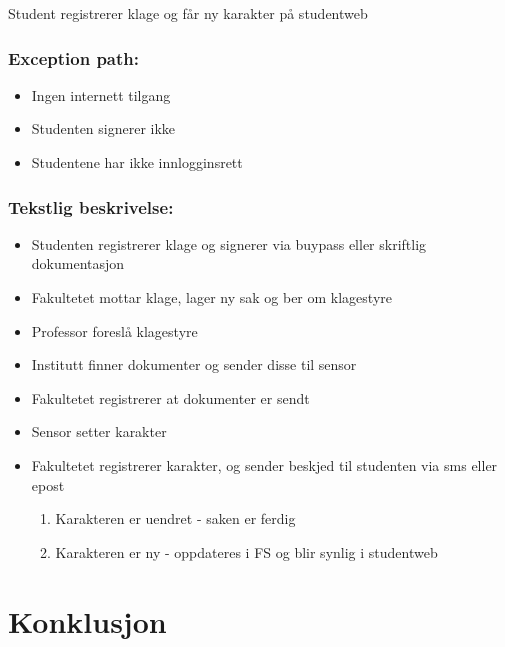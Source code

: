 \documentclass[12pt]{article}
\begin{document}
Student registrerer klage og får ny karakter på studentweb

\subsubsection*{Exception path:}

\begin{itemize}
\item Ingen internett tilgang
\item Studenten signerer ikke
\item Studentene har ikke innlogginsrett
\end{itemize}

\subsubsection*{Tekstlig beskrivelse:}

\begin{itemize}
\item Studenten registrerer klage og signerer via buypass eller skriftlig dokumentasjon
\item Fakultetet mottar klage, lager ny sak og ber om klagestyre
\item Professor foreslå klagestyre
\item Institutt finner dokumenter og sender disse til sensor
\item Fakultetet registrerer at dokumenter er sendt
\item Sensor setter karakter
\item Fakultetet registrerer karakter, og sender beskjed til studenten via sms eller epost
\begin{enumerate}
\item Karakteren er uendret - saken er ferdig
\item Karakteren er ny - oppdateres i FS og blir synlig i studentweb
\end{enumerate}
\end{itemize}







\section{Konklusjon}
\end{document}
